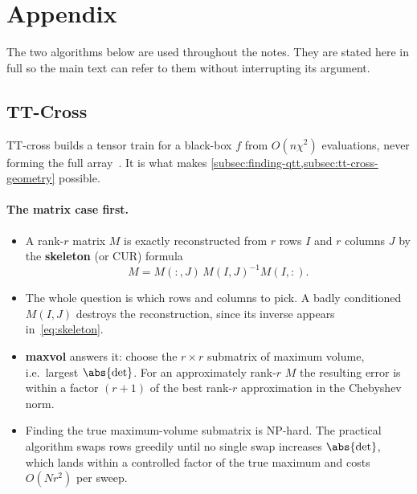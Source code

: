 \appendix
\section{Appendix}
\label{sec:appendix}


The two algorithms below are used throughout the notes. They are stated here in
full so the main text can refer to them without interrupting its argument.

\subsection{TT-Cross}
\label{subsec:appendix-tt-cross}

TT-cross builds a tensor train for a black-box $f$ from $O(n\chi^2)$
evaluations, never forming the full array~\cite{Oseledets2010}. It is
what makes \cref{subsec:finding-qtt,subsec:tt-cross-geometry} possible.

\paragraph{The matrix case first.}
\begin{itemize}
  \item A rank-$r$ matrix $M$ is exactly reconstructed from $r$ rows $I$ and $r$
    columns $J$ by the \textbf{skeleton} (or CUR) formula
    \begin{equation}
      M = M(:,J)\, M(I,J)^{-1} M(I,:) .
      \label{eq:skeleton}
    \end{equation}
  \item The whole question is which rows and columns to pick. A badly
    conditioned $M(I,J)$ destroys the reconstruction, since its inverse appears
    in~\eqref{eq:skeleton}.
  \item \textbf{maxvol} answers it: choose the $r \times r$ submatrix of maximum
    volume, i.e.\ largest $\abs{\det}$. For an approximately rank-$r$ $M$
    the resulting error is within a factor $(r+1)$ of the best rank-$r$
    approximation in the Chebyshev norm.
  \item Finding the true maximum-volume submatrix is NP-hard. The practical
    algorithm swaps rows greedily until no single swap increases $\abs{\det}$,
    which lands within a controlled factor of the true maximum and costs
    $O(N r^2)$ per sweep.
\end{itemize}

